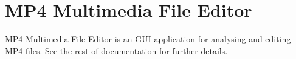 \hypertarget{index_intro_sec}{}\section{M\-P4 Multimedia File Editor}\label{index_intro_sec}
M\-P4 Multimedia File Editor is an G\-U\-I application for analysing and editing M\-P4 files. See the rest of documentation for further details. 